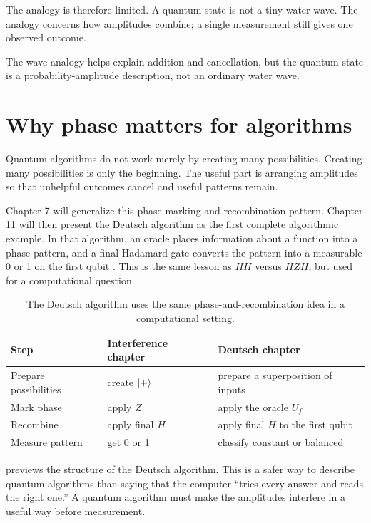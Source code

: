 The analogy is therefore limited. A quantum state is not a tiny water wave. The analogy concerns how amplitudes combine; a single measurement still gives one observed outcome.

\begin{coreidea}
The wave analogy helps explain addition and cancellation, but the quantum state is a probability-amplitude description, not an ordinary water wave.
\end{coreidea}

\section{Why phase matters for algorithms}
\label{sec:ch06-phase-algorithms}

Quantum algorithms do not work merely by creating many possibilities. Creating many possibilities is only the beginning. The useful part is arranging amplitudes so that unhelpful outcomes cancel and useful patterns remain.

Chapter 7 will generalize this phase-marking-and-recombination pattern. Chapter 11 will then present the Deutsch algorithm as the first complete algorithmic example. In that algorithm, an oracle places information about a function into a phase pattern, and a final Hadamard gate converts the pattern into a measurable 0 or 1 on the first qubit \citep{deutsch1985quantumTheory}. This is the same lesson as $H H$ versus $H Z H$, but used for a computational question.

\begin{table}[t]
\centering
\begin{tabular}{lll}
\toprule
Step & Interference chapter & Deutsch chapter \\
\midrule
Prepare possibilities & create $\lvert +\rangle$ & prepare a superposition of inputs \\
Mark phase & apply $Z$ & apply the oracle $U_f$ \\
Recombine & apply final $H$ & apply final $H$ to the first qubit \\
Measure pattern & get 0 or 1 & classify constant or balanced \\
\bottomrule
\end{tabular}
\caption{The Deutsch algorithm uses the same phase-and-recombination idea in a computational setting.}
\label{tab:ch06-deutsch-bridge}
\end{table}

 previews the structure of the Deutsch algorithm. This is a safer way to describe quantum algorithms than saying that the computer ``tries every answer and reads the right one.'' A quantum algorithm must make the amplitudes interfere in a useful way before measurement.

